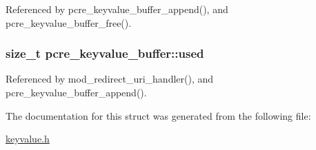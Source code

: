 Referenced by pcre\-\_\-keyvalue\-\_\-buffer\-\_\-append(), and pcre\-\_\-keyvalue\-\_\-buffer\-\_\-free().

\hypertarget{structpcre__keyvalue__buffer_a58f9fa332765d989747b300a30f87bac}{
\subsubsection[{used}]{\setlength{\rightskip}{0pt plus 5cm}size\-\_\-t pcre\-\_\-keyvalue\-\_\-buffer\-::used}}\label{structpcre__keyvalue__buffer_a58f9fa332765d989747b300a30f87bac}


Referenced by mod\-\_\-redirect\-\_\-uri\-\_\-handler(), and pcre\-\_\-keyvalue\-\_\-buffer\-\_\-append().



The documentation for this struct was generated from the following file\-:\begin{DoxyCompactItemize}
\item 
\hyperlink{keyvalue_8h}{keyvalue.\-h}\end{DoxyCompactItemize}
